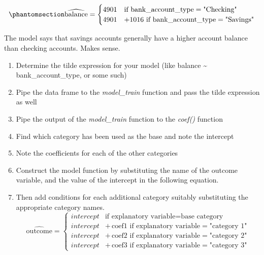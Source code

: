 \documentclass[
  12pt,
  letterpaper,
  DIV=11,
  numbers=noendperiod]{scrreprt}
\providecommand{\tightlist}{%
  \setlength{\itemsep}{0pt}\setlength{\parskip}{0pt}}
\begin{document}
\begin{equation}\phantomsection\label{eq-bank-acct-type-bal-model}{
\widehat{\text{balance}} =
\begin{cases}
4901 & \text{if } \text{bank\_account\_type} = \text{"Checking"} \\
4901 & + 1016\,\, \text{if } \text{bank\_account\_type} = \text{"Savings"}
\end{cases}
}\end{equation}

The model says that savings accounts generally have a higher account
balance than checking accounts. Makes sense.

\begin{tcolorbox}[enhanced jigsaw, colback=white, leftrule=.75mm, toprule=.15mm, bottomtitle=1mm, breakable, coltitle=black, toptitle=1mm, title=\textcolor{quarto-callout-tip-color}{\faLightbulb}\hspace{0.5em}{Steps to build the model function for models with one categorical
explanatory variable}, opacitybacktitle=0.6, colbacktitle=quarto-callout-tip-color!10!white, arc=.35mm, left=2mm, colframe=quarto-callout-tip-color-frame, titlerule=0mm, rightrule=.15mm, bottomrule=.15mm, opacityback=0]

\begin{enumerate}
\def\labelenumi{\arabic{enumi}.}
\tightlist
\item
  Determine the tilde expression for your model (like balance
  \textasciitilde{} bank\_account\_type, or some such)
\item
  Pipe the data frame to the \emph{model\_train} function and pass the
  tilde expression as well
\item
  Pipe the output of the \emph{model\_train} function to the
  \emph{coef()} function
\item
  Find which category has been used as the base and note the intercept
\item
  Note the coefficients for each of the other categories
\item
  Construct the model function by substituting the name of the outcome
  variable, and the value of the intercept in the following equation.
\item
  Then add conditions for each additional category suitably substituting
  the appropriate category names. \[
  \widehat{\text{outcome}} =
  \begin{cases}
  intercept & \text{if } \text{explanatory variable} = \text{base category} \\
  intercept & + \,\text{coef1} \,\, \text{if } \text{explanatory variable} = \text{"category 1"} \\
  intercept & +\, \text{coef2} \,\, \text{if } \text{explanatory variable} = \text{"category 2"} \\
  intercept & +\, \text{coef3} \,\, \text{if } \text{explanatory variable} = \text{"category 3"}
  \end{cases}
  \]
\end{enumerate}

\end{tcolorbox}
\end{document}
